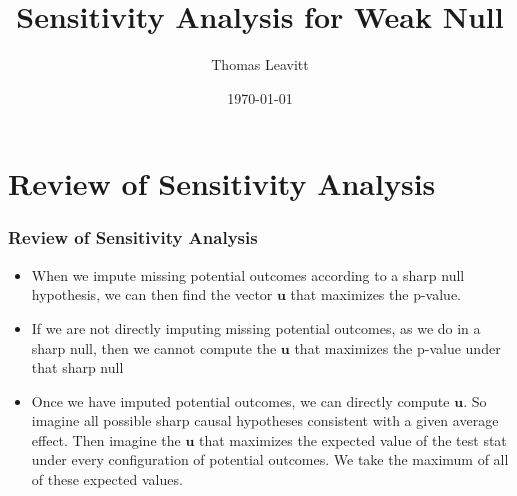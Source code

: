 \documentclass[table, xcolor = {dvipsnames}, 9pt]{beamer}
\title[]{Sensitivity Analysis for Weak Null} %
\author{Thomas Leavitt} %
\institute[Columbia University] %
{
Columbia University \\ %
\medskip
\textit{tl2624@columbia.edu} %
}
\date{\today} %
\theoremstyle{plain}
\begin{document}
\begin{frame}
\titlepage %
\end{frame}


\section{Review of Sensitivity Analysis}
\begin{frame}[t]
\frametitle{Review of Sensitivity Analysis} 
\vfill
\begin{itemize}
\item When we impute missing potential outcomes according to a sharp null hypothesis, we can then find the vector $\bm{u}$ that maximizes the p-value.
\item If we are not directly imputing missing potential outcomes, as we do in a sharp null, then we cannot compute the $\bm{u}$ that maximizes the p-value under that sharp null
\item Once we have imputed potential outcomes, we can directly compute $\bm{u}$. So imagine all possible sharp causal hypotheses consistent with a given average effect. Then imagine the $\bm{u}$ that maximizes the expected value of the test stat under every configuration of potential outcomes. We take the maximum of all of these expected values. 
\end{itemize}  
\vfill
\end{frame}
\end{document}
